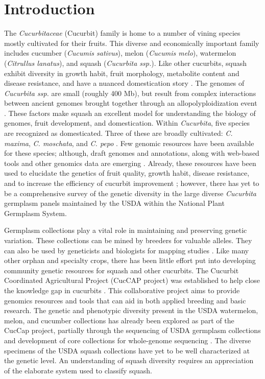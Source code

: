 \documentclass[utf8]{FrontiersinHarvard} %
\begin{document}
\section{Introduction}

The \emph{Cucurbitaceae} (Cucurbit) family is home to a number of vining species
mostly cultivated for their fruits.
This diverse and economically important family includes cucumber (\emph{Cucumis sativus}), melon (\emph{Cucumis melo}), watermelon (\emph{Citrullus lanatus}), and squash (\emph{Cucurbita ssp.})\citep{Ferriol}.
Like other cucurbits, squash exhibit diversity in growth habit, fruit morphology, metabolite content and disease resistance, and have a nuanced domestication story \citep{Chomicki2020,Paris2005}.
The genomes of \emph{Cucurbita ssp.} are small (roughly 400 Mb), but result from complex interactions between ancient genomes brought together through an allopolyploidization event \citep{Sun2017}.
These factors make squash an excellent model for understanding the biology of genomes, fruit development, and domestication.
Within \emph{Cucurbita}, five species are recognized as domesticated.
Three of these are broadly cultivated: \emph{C. maxima}, \emph{C. moschata}, and \emph{C. pepo} \citep{Ferriol}.
Few genomic resources have been available for these species; although, draft genomes and annotations, along with web-based tools and other genomics data are emerging \citep{Yu2022}.
Already, these resources have been used to elucidate the genetics of fruit quality, growth habit, disease resistance, and to increase the efficiency of cucurbit improvement \citep{MonteroPau2017,Zhong2017,Kazminska2018,Wu2019,Xanthopoulou2019,Hernandez2020}; however, there has yet to be a comprehensive survey of the genetic diversity in the large diverse \emph{Cucurbita} germplasm panels maintained by the USDA within the National Plant Germplasm System.

Germplasm collections play a vital role in maintaining and preserving genetic variation.
These collections can be mined by breeders for valuable alleles. They can also be used by geneticists and biologists for mapping studies \citep{McCouch2020}.
Like many other orphan and specialty crops, there has been little effort put into developing community genetic resources for squash and other cucurbits.
The Cucurbit Coordinated Agricultural Project (CucCAP project) was established to help close the knowledge gap in cucurbits \citep{Grumet2021}.
This collaborative project aims to provide genomics resources and tools that can aid in both applied breeding and basic research.
The genetic and phenotypic diversity present in the USDA watermelon, melon, and cucumber collections has already been explored as part of the CucCap project, partially through the sequencing of USDA germplasm collections and development of core collections for whole-genome sequencing \citep{Wang2021,Wang2018,Wu2019a}.
The diverse specimens of the USDA squash collections have yet to be well characterized at the genetic level. An understanding of squash diversity requires an appreciation of the elaborate system used to classify squash.
\end{document}
